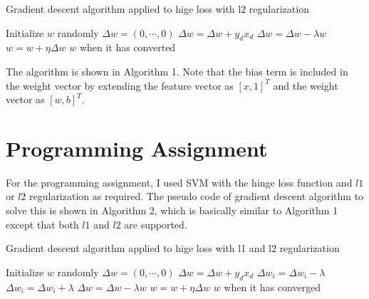 \begin{enumerate}
\begin{enumerate}
\begin{algorithm}
\caption{Gradient descent algorithm applied to hige loss with l2 regularization}\label{euclid}
\begin{algorithmic}[1]
\State Initialize $w$ randomly
\State $\Delta w=(0, \cdots, 0)$
\State $\Delta w= \Delta w+y_d x_d$
\EndIf
\EndFor
\State $\Delta w=\Delta w - \lambda w$
\State $w=w+\eta \Delta w$
\State \Return $w$ when it has converted
\EndFor
\EndProcedure
\end{algorithmic}
\end{algorithm}

The algorithm is shown in Algorithm 1. Note that the bias term is included in the weight vector by extending the feature vector as $[x, 1]^T$ and the weight vector as $[w, b]^T$.



\end{enumerate}

\end{enumerate}

\section{Programming Assignment}

For the programming assignment, I used SVM with the hinge loss function and $l1$ or $l2$ regularization as required. The pseudo code of gradient descent algorithm to solve this is shown in Algorithm 2, which is basically similar to Algorithm 1 except that both $l1$ and $l2$ are supported.

\begin{algorithm}
\caption{Gradient descent algorithm applied to hige loss with l1 and l2 regularization}\label{euclid}
\begin{algorithmic}[1]
\State Initialize $w$ randomly
\State $\Delta w=(0, \cdots, 0)$
\State $\Delta w= \Delta w+y_d x_d$
\EndIf
\EndFor
{}
\State $\Delta w_i=\Delta w_i-\lambda$
\Else
\State $\Delta w_i=\Delta w_i+\lambda$
\EndIf
\EndFor
{}
\State $\Delta w=\Delta w - \lambda w$
\EndIf
\State $w=w+\eta \Delta w$
\State \Return $w$ when it has converged
\EndFor
\EndProcedure
\end{algorithmic}
\end{algorithm}

